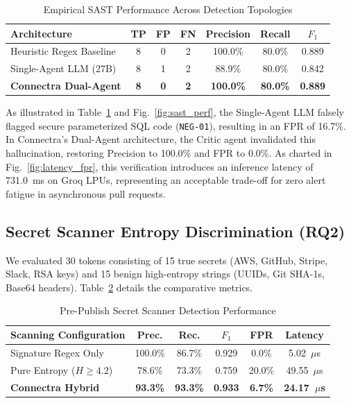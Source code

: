 \documentclass[journal,10pt,twocolumn]{IEEEtran}
\begin{document}
\begin{table}[htbp]
\centering
\caption{Empirical SAST Performance Across Detection Topologies}
\label{tab:sast_comparison}
\begin{tabular}{lcccccc}
\toprule
\textbf{Architecture} & \textbf{TP} & \textbf{FP} & \textbf{FN} & \textbf{Precision} & \textbf{Recall} & \textbf{$F_1$} \\
\midrule
Heuristic Regex Baseline & 8 & 0 & 2 & 100.0\% & 80.0\% & 0.889 \\
Single-Agent LLM (27B) & 8 & 1 & 2 & 88.9\% & 80.0\% & 0.842 \\
\textbf{Connectra Dual-Agent} & \textbf{8} & \textbf{0} & \textbf{2} & \textbf{100.0\%} & \textbf{80.0\%} & \textbf{0.889} \\
\bottomrule
\end{tabular}
\end{table}

As illustrated in Table~\ref{tab:sast_comparison} and Fig.~\ref{fig:sast_perf}, the Single-Agent LLM falsely flagged secure parameterized SQL code (\texttt{NEG-01}), resulting in an FPR of 16.7\%. In Connectra's Dual-Agent architecture, the Critic agent invalidated this hallucination, restoring Precision to 100.0\% and FPR to 0.0\%. As charted in Fig.~\ref{fig:latency_fpr}, this verification introduces an inference latency of 731.0~ms on Groq LPUs, representing an acceptable trade-off for zero alert fatigue in asynchronous pull requests.

\subsection{Secret Scanner Entropy Discrimination (RQ2)}
We evaluated 30 tokens consisting of 15 true secrets (AWS, GitHub, Stripe, Slack, RSA keys) and 15 benign high-entropy strings (UUIDs, Git SHA-1s, Base64 headers). Table~\ref{tab:secret_comparison} details the comparative metrics.

\begin{table}[htbp]
\centering
\caption{Pre-Publish Secret Scanner Detection Performance}
\label{tab:secret_comparison}
\begin{tabular}{lccccc}
\toprule
\textbf{Scanning Configuration} & \textbf{Prec.} & \textbf{Rec.} & \textbf{$F_1$} & \textbf{FPR} & \textbf{Latency} \\
\midrule
Signature Regex Only & 100.0\% & 86.7\% & 0.929 & 0.0\% & 5.02~$\mu$s \\
Pure Entropy ($H \ge 4.2$) & 78.6\% & 73.3\% & 0.759 & 20.0\% & 49.55~$\mu$s \\
\textbf{Connectra Hybrid} & \textbf{93.3\%} & \textbf{93.3\%} & \textbf{0.933} & \textbf{6.7\%} & \textbf{24.17~$\mu$s} \\
\bottomrule
\end{tabular}
\end{table}
\end{document}
